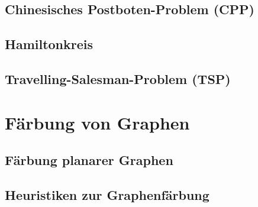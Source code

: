 \documentclass[10pt,a4paper,landscape]{article}
\begin{document}
\begin{multicols*}{2}
    \subsection{ Chinesisches Postboten-Problem (CPP) }

    \subsection{ Hamiltonkreis }

    \subsection{ Travelling-Salesman-Problem (TSP) }


\section{ Färbung von Graphen }
    \subsection{ Färbung planarer Graphen }

    \subsection{ Heuristiken zur Graphenfärbung }


\end{multicols*}
\end{document}
